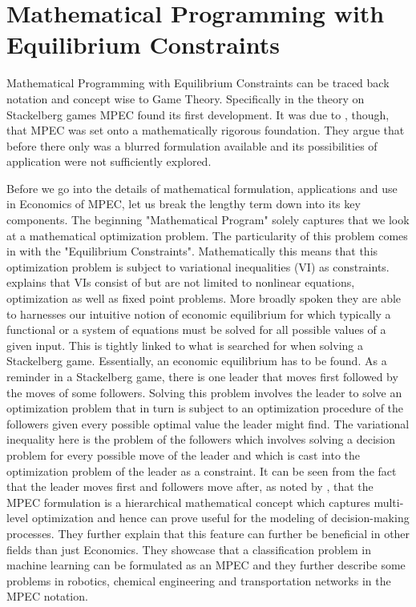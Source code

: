 \section{Mathematical Programming with Equilibrium Constraints}
\thispagestyle{plain} %

Mathematical Programming with Equilibrium Constraints can be traced back notation and concept wise to Game Theory. Specifically in the theory on Stackelberg games MPEC found its first development. It was due to \cite{Luo.Pang.Ralph.1996}, though, that MPEC was set onto a mathematically rigorous foundation. They argue that before there only was a blurred formulation available and its possibilities of application were not sufficiently explored. 

Before we go into the details of mathematical formulation, applications and use in Economics of MPEC, let us break the lengthy term down into its key components. The beginning "Mathematical Program" solely captures that we look at a mathematical optimization problem. The particularity of this problem comes in with the "Equilibrium Constraints". Mathematically this means that this optimization problem is subject to variational inequalities (VI) as constraints. \cite{Nagurney.1993} explains that VIs consist of but are not limited to nonlinear equations, optimization as well as fixed point problems. More broadly spoken they are able to harnesses our intuitive notion of economic equilibrium for which typically a functional or a system of equations must be solved for all possible values of a given input. This is tightly linked to what is searched for when solving a Stackelberg game. Essentially, an economic equilibrium has to be found. As a reminder in a Stackelberg game, there is one leader that moves first followed by the moves of some followers. Solving this problem involves the leader to solve an optimization problem that in turn is subject to an optimization procedure of the followers given every possible optimal value the leader might find. The variational inequality here is the problem of the followers which involves solving a decision problem for every possible move of the leader and which is cast into the optimization problem of the leader as a constraint. It can be seen from the fact that the leader moves first and followers move after, as noted by \cite{Luo.Pang.Ralph.1996}, that the MPEC formulation is a hierarchical mathematical concept which captures multi-level optimization and hence can prove useful for the modeling of decision-making processes. They further explain that this feature can further be beneficial in other fields than just Economics. They showcase that a classification problem in machine learning can be formulated as an MPEC and they further describe some problems in robotics, chemical engineering and transportation networks in the MPEC notation. 

